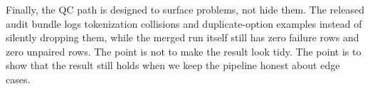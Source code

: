 Finally, the QC path is designed to surface problems, not hide them. The released audit bundle logs \TokenCollisionCount{} tokenization collisions and \DuplicateOptionCount{} duplicate-option examples instead of silently dropping them, while the merged run itself still has zero failure rows and zero unpaired rows. The point is not to make the result look tidy. The point is to show that the result still holds when we keep the pipeline honest about edge cases.

\FloatBarrier
